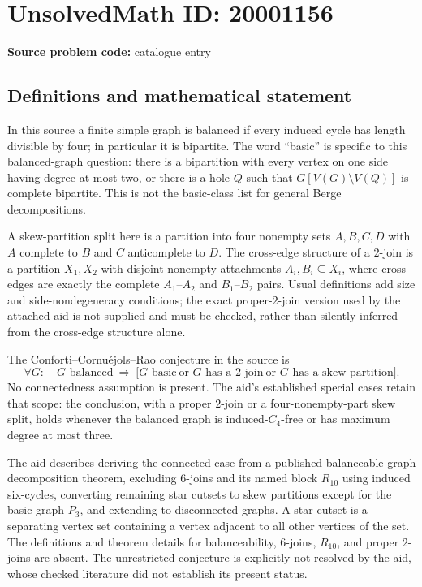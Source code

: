 \documentclass[11pt]{article}
\begin{document}
\section*{UnsolvedMath ID: 20001156}
\textbf{Source problem code:} catalogue entry
\subsection{Definitions and mathematical statement}
In this source a finite simple graph is balanced if every induced cycle has length divisible by four; in particular it is bipartite. The word ``basic'' is specific to this balanced-graph question: there is a bipartition with every vertex on one side having degree at most two, or there is a hole $Q$ such that $G[V(G)\setminus V(Q)]$ is complete bipartite. This is not the basic-class list for general Berge decompositions.

A skew-partition split here is a partition into four nonempty sets $A,B,C,D$ with $A$ complete to $B$ and $C$ anticomplete to $D$. The cross-edge structure of a $2$-join is a partition $X_1,X_2$ with disjoint nonempty attachments $A_i,B_i\subseteq X_i$, where cross edges are exactly the complete $A_1$--$A_2$ and $B_1$--$B_2$ pairs. Usual definitions add size and side-nondegeneracy conditions; the exact proper-$2$-join version used by the attached aid is not supplied and must be checked, rather than silently inferred from the cross-edge structure alone.

The Conforti--Cornu\'ejols--Rao conjecture in the source is
\[
 \forall G:\quad G\text{ balanced}\ \Longrightarrow\
 \bigl[G\text{ basic}\ \text{or }G\text{ has a $2$-join}\
 \text{or }G\text{ has a skew-partition}\bigr].
\]
No connectedness assumption is present. The aid's established special cases retain that scope: the conclusion, with a proper $2$-join or a four-nonempty-part skew split, holds whenever the balanced graph is induced-$C_4$-free or has maximum degree at most three.

The aid describes deriving the connected case from a published balanceable-graph decomposition theorem, excluding $6$-joins and its named block $R_{10}$ using induced six-cycles, converting remaining star cutsets to skew partitions except for the basic graph $P_3$, and extending to disconnected graphs. A star cutset is a separating vertex set containing a vertex adjacent to all other vertices of the set. The definitions and theorem details for balanceability, $6$-joins, $R_{10}$, and proper $2$-joins are absent. The unrestricted conjecture is explicitly not resolved by the aid, whose checked literature did not establish its present status.
\end{document}

